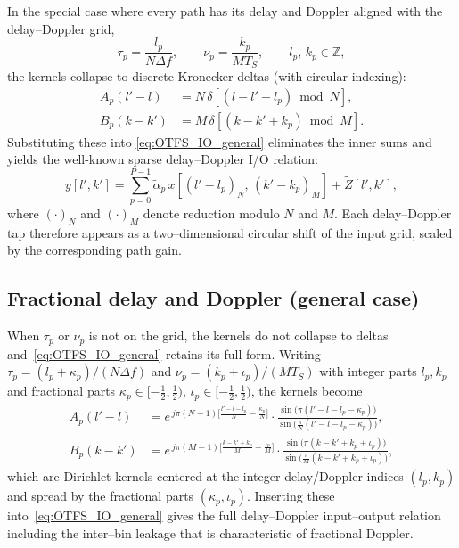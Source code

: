 \documentclass[11pt]{article}
\begin{document}
In the special case where every path has its delay and Doppler aligned with
the delay--Doppler grid,
\begin{equation}
    \tau_p = \frac{l_p}{N\Delta f}, \qquad
    \nu_p  = \frac{k_p}{M T_S},
    \qquad l_p,\, k_p \in \mathbb{Z},
\end{equation}
the kernels collapse to discrete Kronecker deltas (with circular indexing):
\begin{align}
    A_p(l'-l) &= N\,\delta\!\left[(l - l' + l_p)\bmod N\right], \\
    B_p(k-k') &= M\,\delta\!\left[(k - k' + k_p)\bmod M\right].
\end{align}
Substituting these into \eqref{eq:OTFS_IO_general} eliminates the inner sums
and yields the well-known sparse delay--Doppler I/O relation:
\begin{equation}
    y[l',k'] = \sum_{p=0}^{P-1} \tilde{\alpha}_p\,
               x\!\left[(l' - l_p)_N,\, (k' - k_p)_M\right]
               + \tilde{Z}[l',k'],
\label{eq:OTFS_IO_integer}
\end{equation}
where \((\cdot)_N\) and \((\cdot)_M\) denote reduction modulo \(N\) and
\(M\). Each delay--Doppler tap therefore appears as a two--dimensional
circular shift of the input grid, scaled by the corresponding path gain.

\subsection*{Fractional delay and Doppler (general case)}

When \(\tau_p\) or \(\nu_p\) is not on the grid, the kernels do not collapse
to deltas and~\eqref{eq:OTFS_IO_general} retains its full form. Writing
\(\tau_p = (l_p + \kappa_p)/(N\Delta f)\) and
\(\nu_p  = (k_p + \iota_p)/(MT_S)\) with integer parts \(l_p,k_p\) and
fractional parts \(\kappa_p \in [-\tfrac12,\tfrac12)\),
\(\iota_p \in [-\tfrac12,\tfrac12)\), the kernels become
\begin{align}
A_p(l'-l) &= e^{\,j\pi(N-1)\bigl[\tfrac{l'-l-l_p}{N} - \tfrac{\kappa_p}{N}\bigr]}
             \cdot
             \frac{\sin\!\bigl(\pi(l'-l-l_p-\kappa_p)\bigr)}
                  {\sin\!\bigl(\tfrac{\pi}{N}(l'-l-l_p-\kappa_p)\bigr)}, \\
B_p(k-k') &= e^{\,j\pi(M-1)\bigl[\tfrac{k-k'+k_p}{M} + \tfrac{\iota_p}{M}\bigr]}
             \cdot
             \frac{\sin\!\bigl(\pi(k-k'+k_p+\iota_p)\bigr)}
                  {\sin\!\bigl(\tfrac{\pi}{M}(k-k'+k_p+\iota_p)\bigr)},
\end{align}
which are Dirichlet kernels centered at the integer delay/Doppler indices
\((l_p,k_p)\) and spread by the fractional parts \((\kappa_p,\iota_p)\).
Inserting these into~\eqref{eq:OTFS_IO_general} gives the full
delay--Doppler input--output relation including the inter--bin leakage that
is characteristic of fractional Doppler.
\end{document}
